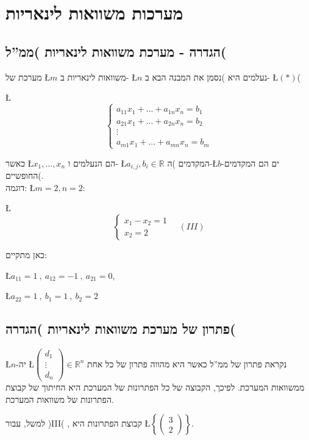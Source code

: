 \documentclass[english,hebrew]{article}
\begin{document}
\section{מערכות משוואות לינאריות}

\subsection{הגדרה - מערכת משוואות לינאריות )ממ\textquotedblright ל(}

מערכת של \L{$m$} משוואות לינאריות ב- \L{$n$} נעלמים היא )נסמן את
המבנה הבא ב- \L{$(*)$}(

\L{%
\[
\begin{cases}
a_{11}x_{1}+...+a_{1n}x_{n}=b_{1}\\
a_{21}x_{1}+...+a_{2n}x_{n}=b_{2}\\
\vdots\\
a_{m1}x_{1}+...+a_{mn}x_{n}=b_{m}
\end{cases}
\]
}%

כאשר \L{$x_{1},\dots,x_{n}$} הם הנעלמים ו- \L{$a_{i,j},b_{i}\in\mathbb{R}$}
המקדמים )ה-\L{$b$}-ים הם המקדמים החופשיים(.\\

דוגמה: \L{$m=2,n=2$}:

\L{%
\[
\begin{cases}
x_{1}-x_{2}=1\\
x_{2}=2
\end{cases}\quad(III)
\]
}%

כאן מתקיים:

\L{$a_{11}=1\ ,\ a_{12}=-1\ ,\ a_{21}=0$},

\L{$a_{22}=1\ ,\ b_{1}=1\ ,\ b_{2}=2$}

\subsection{פתרון של מערכת משוואות לינאריות )הגדרה(}

\L{$n$}-יה \L{$\begin{pmatrix}d_{1}\\
\vdots\\
d_{n}
\end{pmatrix}\in\mathbb{R}^{n}$} נקראת פתרון של ממ\textquotedblright ל כאשר היא מהווה פתרון של כל
אחת ממשוואות המערכת. לפיכך, הקבוצה של כל הפתרונות של המערכת היא החיתוך
של קבוצת הפתרונות של משוואות המערכת.

למשל, עבור )III( , קבוצת הפתרונות היא \L{$\left\{ \begin{pmatrix}3\\
2
\end{pmatrix}\right\} $}.
\end{document}
